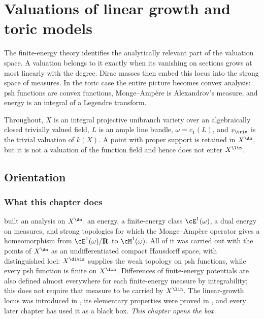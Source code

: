 \chapter{Valuations of linear growth and toric models}
\label{chap:bj-linear-growth}

The finite-energy theory identifies the analytically relevant part of the
valuation space.  A valuation belongs to it exactly when its vanishing on
sections grows at most linearly with the degree.  Dirac masses then embed
this locus into the strong space of measures.  In the toric case the entire
picture becomes convex analysis: psh functions are convex functions,
Monge--Amp\`ere is Alexandrov's measure, and energy is an integral of a
Legendre transform.

Throughout, $X$ is an integral projective unibranch variety over an algebraically
closed trivially valued field, $L$ is an ample line bundle,
$\omega=c_1(L)$, and $v_{\triv}$ is the trivial valuation of $k(X)$.
A point with proper support is retained in $X^{\An}$, but it is not a
valuation of the function field and hence does not enter $X^{\lin}$.

\section{Orientation}
\label{sec:ch49-orientation}

\subsection{What this chapter does}
\label{sec:ch49-what}

 built
an analysis on $X^{\An}$: an energy, a finite-energy class
$\cE^1(\omega)$, a dual energy on measures, and strong topologies for
which the Monge--Amp\`ere operator gives a homeomorphism from
$\cE^1(\omega)/\mathbf R$ to $\cM^1(\omega)$.  All of it
was carried out with the points of $X^{\An}$ as an undifferentiated
compact Hausdorff space, with distinguished loci: $X^{\divis}$ supplies
the weak topology on psh functions, while every psh function is finite on
$X^{\lin}$.  Differences of finite-energy potentials are also defined
almost everywhere for each finite-energy measure by integrability;
this does not require that measure to be carried by $X^{\lin}$.
The linear-growth locus was
introduced in , its elementary properties were
proved in , and every later chapter has
used it as a black box.  \emph{This chapter opens the box.}

